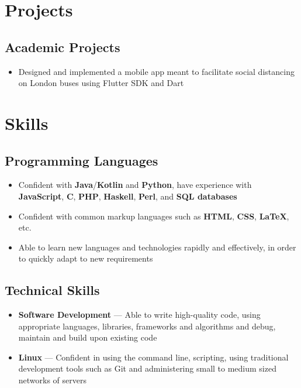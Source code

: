 \documentclass[a4paper]{article}
\begin{document}
\section*{Projects}

\subsection*{Academic Projects}
\begin{itemize}
	\item Designed and implemented a mobile app meant to facilitate social distancing on London buses using Flutter SDK and Dart
\end{itemize}

\section*{Skills}

\subsection*{Programming Languages}
\begin{itemize}
	\item Confident with \textbf{Java}/\textbf{Kotlin} and \textbf{Python}, have experience with \textbf{JavaScript}, \textbf{C},
	      \textbf{PHP}, \textbf{Haskell}, \textbf{Perl}, and \textbf{SQL databases}
	\item Confident with common markup languages such as \textbf{HTML},
	      \textbf{CSS}, \textbf{{\LaTeX}}, etc.
	\item Able to learn new languages and technologies rapidly and effectively,
	      in order to quickly adapt to new requirements
\end{itemize}

\subsection*{Technical Skills}
\begin{itemize}
	\item \textbf{Software Development} --- Able to write high-quality code, using
	      appropriate languages, libraries, frameworks and algorithms and debug,
	      maintain and build upon existing code
	\item \textbf{Linux} --- Confident in using the command line, scripting, using
	      traditional development tools such as Git and administering small to
	      medium sized networks of servers
\end{itemize}
\end{document}
